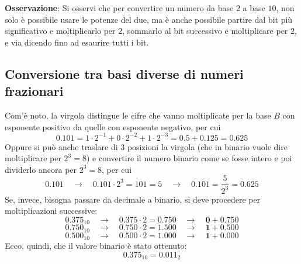\documentclass[a4paper]{extarticle}
\begin{document}
\vspace{1em}
\noindent
\textbf{Osservazione}: Si osservi che per convertire un numero da base $2$ a base $10$, non solo è possibile usare le potenze del due, ma è anche possibile partire dal bit più significativo e moltiplicarlo per $2$, sommarlo al bit successivo e moltiplicare per $2$, e via dicendo fino ad esaurire tutti i bit.

\vspace{1em}
\noindent
\subsection{Conversione tra basi diverse di numeri frazionari}
Com'è noto, la virgola distingue le cifre che vanno moltiplicate per la base $B$ con esponente positivo da quelle con esponente negativo, per cui
\[0.101 = 1 \cdot 2^{-1} + 0 \cdot 2^{-2} + 1 \cdot 2^{-3} = 0.5 + 0.125 = 0.625\]
Oppure si può anche traslare di $3$ posizioni la virgola (che in binario vuole dire moltiplicare per $2^3=8$) e convertire il numero binario come se fosse intero e poi dividerlo ancora per $2^3=8$, per cui
\[0.101 \hspace{1em} \rightarrow \hspace{1em} 0.101 \cdot 2^3 = 101 = 5 \hspace{1em} \rightarrow \hspace{1em} 0.101 = \frac{5}{2^3} = 0.625\]
Se, invece, bisogna passare da decimale a binario, si deve procedere per moltiplicazioni successive:
\[0.375_10 \hspace{1em} \rightarrow \hspace{1em} 0.375 \cdot 2 = 0.750 \hspace{1em} \rightarrow \hspace{1em} \textbf{0} + 0.750\]
\[0.750_10 \hspace{1em} \rightarrow \hspace{1em} 0.750 \cdot 2 = 1.500 \hspace{1em} \rightarrow \hspace{1em} \textbf{1} + 0.500\]
\[0.500_10 \hspace{1em} \rightarrow \hspace{1em} 0.500 \cdot 2 = 1.000 \hspace{1em} \rightarrow \hspace{1em} \textbf{1} + 0.000\]
Ecco, quindi, che il valore binario è stato ottenuto:
\[0.375_10 = 0.011_2\]
\end{document}
